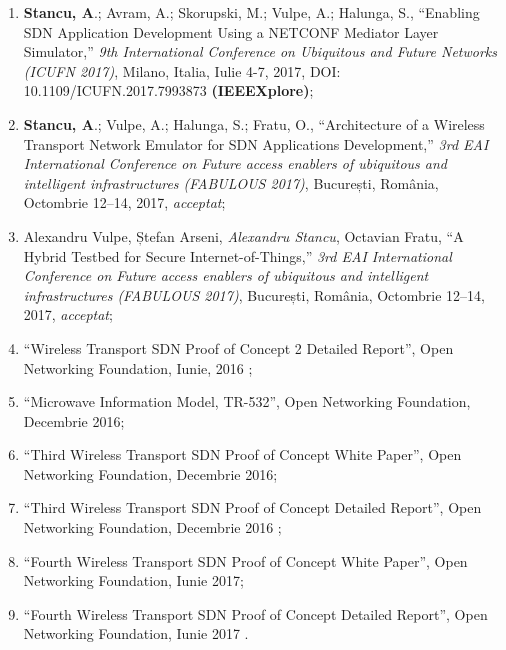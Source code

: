 \begin{enumerate}
	\item \textbf{Stancu, A}.; Avram, A.; Skorupski, M.; Vulpe, A.; Halunga, S., ``Enabling SDN Application Development Using a NETCONF Mediator Layer Simulator,'' \textit{9th International Conference on Ubiquitous and Future Networks (ICUFN 2017)}, Milano, Italia, Iulie 4-7, 2017, DOI: 10.1109/ICUFN.2017.7993873 \textbf{(IEEEXplore)}\label{item:dvm_v02};
	
	\item \textbf{Stancu, A}.; Vulpe, A.; Halunga, S.; Fratu, O., ``Architecture of a Wireless Transport Network Emulator for SDN Applications Development,'' \textit{3rd EAI International Conference on Future access enablers of ubiquitous and intelligent infrastructures (FABULOUS 2017)}, București, România, Octombrie 12–14, 2017, \textit{acceptat}\label{item:wte};
	
	\item Alexandru Vulpe, Ștefan Arseni, \textit{Alexandru Stancu}, Octavian Fratu, ``A Hybrid Testbed for Secure Internet-of-Things,'' \textit{3rd EAI International Conference on Future access enablers of ubiquitous and intelligent infrastructures (FABULOUS 2017)}, București, România, Octombrie 12–14, 2017, \textit{acceptat};
	
	\item ``Wireless Transport SDN Proof of Concept 2 Detailed Report'', Open Networking Foundation, Iunie, 2016 \label{item:poc_2};
	
	\item ``Microwave Information Model, TR-532'', Open Networking Foundation, Decembrie 2016;
	
	\item ``Third Wireless Transport SDN Proof of Concept White Paper'', Open Networking Foundation, Decembrie 2016;
	
	\item ``Third Wireless Transport SDN Proof of Concept Detailed Report'', Open Networking Foundation, Decembrie 2016 \label{item:poc_3};
	
	\item ``Fourth Wireless Transport SDN Proof of Concept White Paper'', Open Networking Foundation, Iunie 2017;
	
	\item ``Fourth Wireless Transport SDN Proof of Concept Detailed Report'', Open Networking Foundation, Iunie 2017 \label{item:poc_4}.
	
\end{enumerate}
